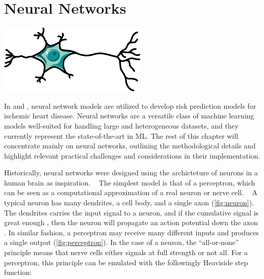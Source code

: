 \clearpage
\section{Neural Networks}

\begin{marginfigure}[3em]
	\includegraphics[width=\linewidth]{graphics/neuron}
    \caption[Schematic diagram of a neuron]{%
        Schematic diagram of a neuron.
        A typical neuron has dendrites, a cell body, and a single axon; 
        the dendrites receive input signals from other neurons,
        and propagates output signals along the axon.
    }
    \label{fig:neuron}
\end{marginfigure}%

In \studyii{} and \studyiii{}, 
neural network models are utilized to 
develop risk prediction models for ischemic heart disease.
Neural networks are a versatile class of machine learning models
well-suited for handling large and heterogeneous datasets, 
and they currently represent the state-of-the-art in \ac{ML}.
The rest of this chapter will concentrate mainly on neural networks, 
outlining the methodological details and highlight 
relevant practical challenges and considerations 
in their implementation.

Historically, neural networks were designed
using the archicteture of neurons in a human brain as inspiration.
~\autocite{goodfellow2016deep}
The simplest model is that of a perceptron, 
which can be seen as a computational approximation
of a real neuron or nerve cell.
~\autocite{charniakIntroduction2019}
A typical neuron has many dendrites, a cell body, and a single axon 
(\cref{fig:neuron}).
The dendrites carries the input signal to a neuron,
and if the cumulative signal is great enough%
, 
then the neuron will propagate an action potential down the axon%
\autocite{seifterConcepts2005}.
In similar fashion, a perceptron  may receive many different inputs
and produces a single output (\cref{fig:perceptron}).
In the case of a neuron, the \enquote{all-or-none} principle means
that nerve cells either signals at full strength or not all.
For a perceptron, this principle can be emulated
with the followingly Heaviside step function:
~\autocite{charniakIntroduction2019}

